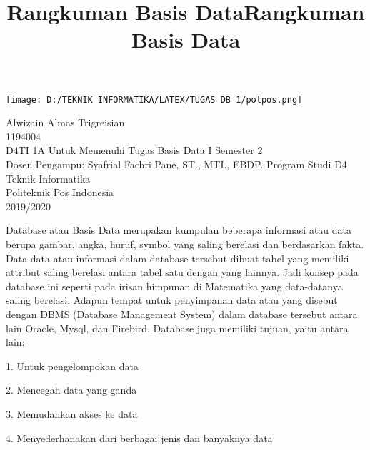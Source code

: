 \documentclass[a4paper, 12 pt]{article}
\author{}
\title{\textbf{Rangkuman Basis Data}\linebreak}
\date{}
\begin{document}
	
	\maketitle
	\begin{center}
		\texttt{[image: D:/TEKNIK INFORMATIKA/LATEX/TUGAS DB 1/polpos.png]}
	\end{center}
	\vspace{0.5 cm}
	
	\begin{center}
		Alwizain Almas Trigreisian \\
		1194004 \\
		D4TI 1A \linebreak
		\newline
		\newline
		\newline
		Untuk Memenuhi Tugas Basis Data I Semester 2 \\
		Dosen Pengampu: Syafrial Fachri Pane, ST., MTI., EBDP. \linebreak
		\newline
		\newline
		Program Studi D4 Teknik Informatika \\
		Politeknik Pos Indonesia\\
		2019/2020\\
	\end{center}
	
	\newpage
	\begin{flushleft}
		\title{\textbf{Rangkuman Basis Data}}\linebreak
	\end{flushleft}

		\par Database atau Basis Data merupakan kumpulan beberapa informasi atau data berupa gambar, angka, huruf, symbol yang saling berelasi dan berdasarkan fakta. Data-data atau informasi dalam database tersebut dibuat tabel yang memiliki attribut saling berelasi 			antara tabel satu dengan yang lainnya. Jadi konsep pada database ini seperti pada irisan himpunan di Matematika yang data-datanya saling berelasi. Adapun tempat untuk penyimpanan data atau yang disebut dengan DBMS (Database Management System) dalam 			database tersebut antara lain Oracle, Mysql, dan Firebird. Database juga memiliki tujuan, yaitu antara lain:
		\par 1. Untuk pengelompokan data
		\par 2. Mencegah data yang ganda
		\par 3. Memudahkan akses ke data
		\par 4. Menyederhanakan dari berbagai jenis dan banyaknya data\\ \linebreak
\end{document}
